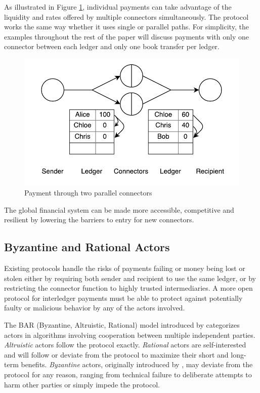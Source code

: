\documentclass[letterpaper,twocolumn,10pt]{article}
\begin{document}
As illustrated in Figure \ref{fig:parallel-path}, individual payments can take advantage of the liquidity and rates offered by multiple connectors simultaneously. The protocol works the same way whether it uses single or parallel paths. For simplicity, the examples throughout the rest of the paper will discuss payments with only one connector between each ledger and only one book transfer per ledger.

\begin{figure}[ht]
    \centering
    \includegraphics[width=\columnwidth]{figures/parallel-path.pdf}
    \caption{Payment through two parallel connectors}
    \label{fig:parallel-path}
\end{figure}

The global financial system can be made more accessible, competitive and resilient by lowering the barriers to entry for new connectors.

\subsection{Byzantine and Rational Actors}

Existing protocols handle the risks of payments failing or money being lost or stolen either by requiring both sender and recipient to use the same ledger, or by restricting the connector function to highly trusted intermediaries. A more open protocol for interledger payments must be able to protect against potentially faulty or malicious behavior by any of the actors involved.

The BAR (Byzantine, Altruistic, Rational) model introduced by \cite{aiyer2005bar} categorizes actors in algorithms involving cooperation between multiple independent parties. \textit{Altruistic} actors follow the protocol exactly. \textit{Rational} actors are self-interested and will follow or deviate from the protocol to maximize their short and long-term benefits. \textit{Byzantine} actors, originally introduced by \cite{lamport1982byzantine}, may deviate from the protocol for any reason, ranging from technical failure to deliberate attempts to harm other parties or simply impede the protocol.
\end{document}
